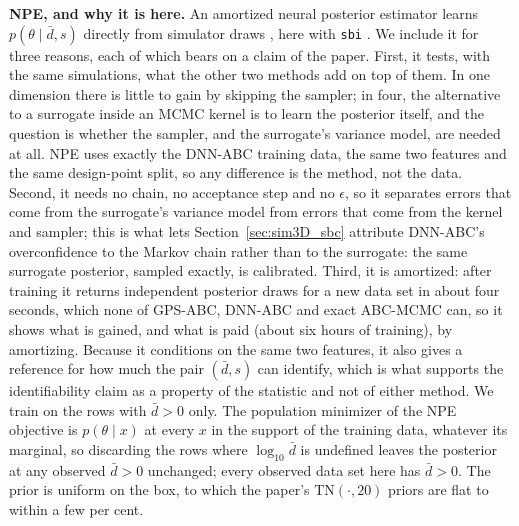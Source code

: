 \documentclass[sn-basic,iicol,pdflatex]{sn-jnl}
\begin{document}
\noindent\textbf{NPE, and why it is here.} An amortized neural posterior estimator
learns $p(\theta\mid\bar d,s)$ directly from simulator draws
\citep{papamakarios2016,greenberg2019}, here with \texttt{sbi}
\citep{tejerocantero2020}. We include it for three reasons, each of which bears on a claim of the paper. First, it
tests, with the same simulations, what the other two methods add on top of them. In one
dimension there is little to gain by skipping the sampler; in four, the
alternative to a surrogate inside an MCMC kernel is to learn the posterior
itself, and the question is whether the sampler, and the surrogate's variance
model, are needed at all. NPE uses exactly the DNN-ABC training data, the same
two features and the same design-point split, so any difference is the
method, not the data. Second, it needs no chain, no acceptance step and no $\epsilon$, so it
separates errors that come from the surrogate's variance model from errors that
come from the kernel and sampler; this is what lets Section~\ref{sec:sim3D_sbc} attribute
DNN-ABC's overconfidence to the Markov chain rather than to the surrogate: the same surrogate posterior, sampled exactly, is calibrated. Third, it is amortized: after training it returns
independent posterior draws for a new data set in about four seconds, which none of GPS-ABC,
DNN-ABC and exact ABC-MCMC can, so it shows what is gained, and what is paid
(about six hours of training), by amortizing. Because it conditions on the same two
features, it also gives a reference for how much the pair $(\bar d,s)$ can identify, which
is what supports the identifiability claim as a property of the statistic and not of either method. We
train on the rows with $\bar d>0$ only. The population minimizer of the NPE
objective is $p(\theta\mid x)$ at every $x$ in the support of the training data,
whatever its marginal, so discarding the rows where $\log_{10}\bar d$ is undefined
leaves the posterior at any observed $\bar d>0$ unchanged; every observed data set
here has $\bar d>0$. The prior is uniform on the box, to which the paper's
$\mathrm{TN}(\cdot,20)$ priors are flat to within a few per cent.
\end{document}
